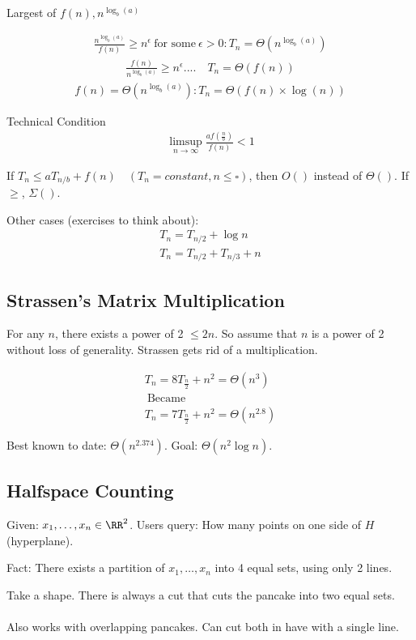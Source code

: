 \documentclass[class=scrartcl, crop=false]{standalone}
\begin{document}
Largest of $f(n), n^{\log_b(a)}$


\begin{enumerate}
  \ii
  \begin{gather*}
    \frac{n^{\log_b(a)}}{f(n)} \geq n^\epsilon \ \text{for some} \  \epsilon > 0 : T_n = \Theta(n^{\log_b(a)})
  \end{gather*} 
  \ii
  \begin{gather*}
    \frac{f(n)}{n^{\log_b(a)}} \geq n^\epsilon .... \quad T_n = \Theta(f(n))
  \end{gather*} 
  \ii
  \begin{gather*}
    f(n) = \Theta(n^{\log_b(a)}) : T_n = \Theta(f(n) \times \log(n))
  \end{gather*} 
\end{enumerate} 
Technical Condition
\begin{gather*}
  \limsup_{n \to \infty}\frac{af(\frac{n}{b})}{f(n)} < 1
\end{gather*} 

If $ T_n \leq aT_{n / b} + f(n) \quad (T_n = constant, n \leq \square) $, then $O()$ instead of $\Theta()$. If $\geq$, $\Sigma()$.

Other cases (exercises to think about):
\begin{gather*}
  T_n = T_{n / 2} + \log n \\
  T_n = T_{n / 2} + T_{n / 3} + n
\end{gather*} 

\subsection{Strassen's Matrix Multiplication}

For any $n$, there exists a power of 2 $\leq 2n$. So assume that $n$ is a power of 2 without loss of generality. Strassen gets rid of a multiplication.

\begin{gather*}
  T_n = 8T_{\frac{n}{2}} + n^2 = \Theta(n^3) \\
  \ \text{Became} \ \\
  T_n = 7T_{\frac{n}{2}} + n^2 = \Theta(n^{2.8})
\end{gather*} 

Best known to date: $\Theta(n^{2.374})$. Goal: $\Theta(n^2\log n)$.

\subsection{Halfspace Counting}

Given: $x_1, \dots, x_n \in \RR^2$. Users query: How many points on one side of $H$ (hyperplane).

Fact: There exists a partition of $x_1, \dots, x_n$ into 4 equal sets, using only 2 lines.

\begin{theorem}
  Take a shape. There is always a cut that cuts the pancake into two equal sets.
  \\\\
  Also works with overlapping pancakes. Can cut both in have with a single line.
\end{theorem} 
\end{document}
